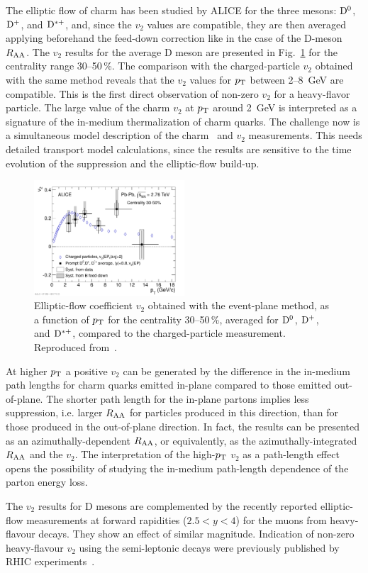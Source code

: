 The elliptic flow of charm has been studied by ALICE for the three mesons: ${\rm D}^0$, ${\rm D}^+$, and ${\rm D}^{*+}$, and, since the $v_2$ values are compatible, they are then averaged applying beforehand the feed-down correction like in the case of the D-meson $R_{\rm AA}$. The $v_2$ results for the average D meson are presented in Fig.~\ref{figks:DmesonV2} for the centrality range 30--50\,\%. The comparison with the charged-particle $v_2$ obtained with the same method reveals that the $v_2$ values for $p_{\rm T}$ between 2--8~GeV are compatible. This is the first direct observation of non-zero $v_2$ for a heavy-flavor particle. The large value of the charm $v_2$ at $p_{\rm T}$ around 2~GeV is interpreted as a signature of the in-medium thermalization of charm quarks. The challenge now is a simultaneous model description of the charm \Raa\ and $v_2$ measurements. This needs detailed transport model calculations, since the results are sensitive to the time evolution of the suppression and the elliptic-flow build-up.

\begin{figure}[!ht]
\centering
\includegraphics[width=0.5\textwidth]{heavyflavorfigs/DmesonV2.pdf}
\caption{Elliptic-flow coefficient $v_2$ obtained with the event-plane method, as a function of $p_{\rm T}$ for the centrality 30--50\,\%, averaged for ${\rm D}^0$, ${\rm D}^+$, and ${\rm D}^{*+}$, compared to the charged-particle measurement. Reproduced from~\cite{Abelev:2013lca}.}
\label{figks:DmesonV2}
\end{figure}

At higher $p_{\rm T}$ a positive $v_2$ can be generated by the difference in the in-medium path lengths for charm quarks emitted in-plane compared to those emitted out-of-plane. The shorter path length for the in-plane partons implies less suppression, i.e. larger $R_{\rm AA}$ for particles produced in this direction, than for those produced in the out-of-plane direction. In fact, the results can be presented as an azimuthally-dependent $R_{\rm AA}$, or equivalently, as the azimuthally-integrated $R_{\rm AA}$ and the $v_2$. The interpretation of the high-$p_{\rm T}$ $v_2$ as a path-length effect opens the possibility of studying  the in-medium path-length dependence of the parton energy loss.

The $v_2$ results for D mesons are complemented by the recently reported elliptic-flow measurements at forward rapidities ($2.5 < y < 4$) for the muons from heavy-flavour decays. They show an effect of similar magnitude. Indication of non-zero heavy-flavour $v_2$ using the semi-leptonic decays were previously published by RHIC experiments~\cite{Adler:2005ab,Adare:2006nq}. 